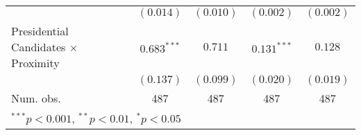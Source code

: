 \begin{tabular}{l c c c c }
                                           & $(0.014)$      & $(0.010)$ & $(0.002)$      & $(0.002)$ \\
Presidential Candidates $\times$ Proximity & $0.683^{***}$  & $0.711$   & $0.131^{***}$  & $0.128$   \\
                                           & $(0.137)$      & $(0.099)$ & $(0.020)$      & $(0.019)$ \\
\hline
Num. obs.                                  & 487            & 487       & 487            & 487       \\
\hline
\multicolumn{5}{l}{\scriptsize{$^{***}p<0.001$, $^{**}p<0.01$, $^*p<0.05$}}
\end{tabular}
